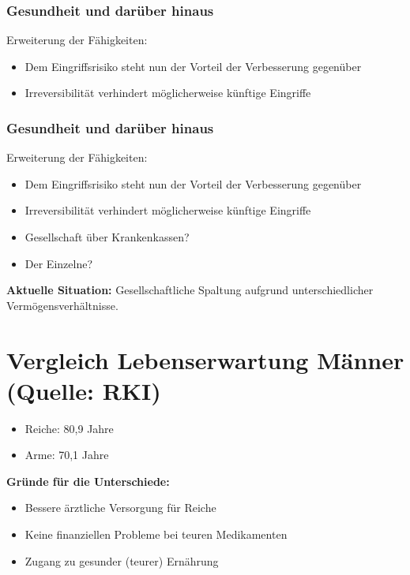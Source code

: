 \documentclass[aspectratio=169,16pt,xcolor=table]{beamer}
\begin{document}
\begin{frame}
  \frametitle{Gesundheit und darüber hinaus}
  Erweiterung der Fähigkeiten:
  \begin{itemize}
      \item Dem Eingriffsrisiko steht nun der Vorteil der Verbesserung gegenüber
      \item Irreversibilität verhindert möglicherweise künftige Eingriffe
  \end{itemize}
\end{frame}

\begin{frame}
  \frametitle{Gesundheit und darüber hinaus}
  Erweiterung der Fähigkeiten:
  \begin{itemize}
      \item Dem Eingriffsrisiko steht nun der Vorteil der Verbesserung gegenüber
      \item Irreversibilität verhindert möglicherweise künftige Eingriffe
  \end{itemize}
\end{frame}

\begin{frame}
  \begin{itemize}
    \item Gesellschaft über Krankenkassen?
    \item Der Einzelne?
  \end{itemize}

  \textbf{Aktuelle Situation:} Gesellschaftliche Spaltung aufgrund unterschiedlicher Vermögensverhältnisse.

  \section*{Vergleich Lebenserwartung Männer (Quelle: RKI)}

  \begin{itemize}
    \item Reiche: 80,9 Jahre
    \item Arme: 70,1 Jahre
  \end{itemize}

  \textbf{Gründe für die Unterschiede:}
  \begin{itemize}
    \item Bessere ärztliche Versorgung für Reiche
    \item Keine finanziellen Probleme bei teuren Medikamenten
    \item Zugang zu gesunder (teurer) Ernährung
  \end{itemize}
\end{frame}
\end{document}
